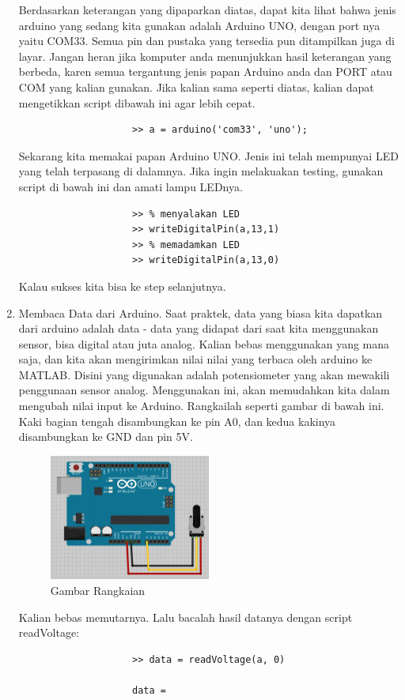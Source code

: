 \begin{enumerate}
				Berdasarkan keterangan yang dipaparkan diatas, dapat kita lihat bahwa jenis arduino yang sedang kita gunakan adalah Arduino UNO, dengan port nya yaitu COM33. Semua pin dan pustaka yang tersedia pun ditampilkan juga di layar. Jangan heran jika komputer anda menunjukkan hasil keterangan yang berbeda, karen semua tergantung jenis papan Arduino anda dan PORT atau COM yang kalian gunakan. Jika kalian sama seperti diatas, kalian dapat mengetikkan script dibawah ini agar lebih cepat.
				
				\begin{verbatim}
					>> a = arduino('com33', 'uno');
				\end{verbatim}
				
				Sekarang kita memakai papan Arduino UNO. Jenis ini telah mempunyai LED  yang telah terpasang di dalamnya. Jika ingin melakuakan testing, gunakan script di bawah ini dan amati lampu LEDnya.
				
				\begin{verbatim}
					>> % menyalakan LED
					>> writeDigitalPin(a,13,1)
					>> % memadamkan LED
					>> writeDigitalPin(a,13,0)
				\end{verbatim}
				
				Kalau sukses kita bisa ke step selanjutnya.
				
			\item Membaca Data dari Arduino.
				Saat praktek, data yang biasa kita dapatkan dari arduino adalah data - data yang didapat dari saat kita menggunakan sensor, bisa digital atau juta analog. Kalian bebas menggunakan yang mana saja, dan kita akan mengirimkan nilai nilai yang terbaca oleh arduino ke MATLAB. Disini yang digunakan adalah potensiometer yang akan mewakili penggunaan sensor analog. Menggunakan ini, akan memudahkan kita dalam mengubah nilai input ke Arduino. Rangkailah seperti gambar di bawah ini. Kaki bagian tengah disambungkan ke pin A0, dan kedua kakinya disambungkan ke GND dan pin 5V.
				
				\begin{figure}[ht]
					\centerline{\includegraphics[width=0.5\textwidth]{figures/arduino.png}}
					\caption{Gambar Rangkaian}
					\label{arduino}
				\end{figure}
				
				Kalian bebas memutarnya. Lalu bacalah hasil datanya dengan script readVoltage:
				
				\begin{verbatim}
					>> data = readVoltage(a, 0)
 
					data =
				\end{verbatim}
				
		\end{enumerate}
		
\cite{steiner2009firmata}